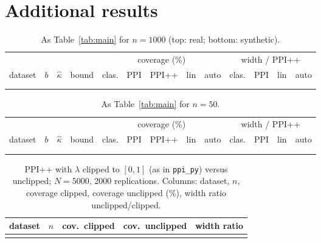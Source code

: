 \documentclass{article}
\begin{document}
\section{Additional results}
\begin{table}[h]
\caption{As Table~\ref{tab:main} for $n=1000$ (top: real; bottom: synthetic).}\label{tab:n1000}
\centering\scriptsize\setlength{\tabcolsep}{2.6pt}
\begin{tabular}{lrrr|ccccc|cccc}\toprule
 & & & & \multicolumn{5}{c|}{coverage (\%)} & \multicolumn{4}{c}{width / PPI++} \\
dataset & $b$ & $\hat\kappa$ & bound & clas. & PPI & PPI++ & lin & auto & clas. & PPI & lin & auto \\\midrule
\\\midrule
\\\bottomrule\end{tabular}
\end{table}
\begin{table}[h]
\caption{As Table~\ref{tab:main} for $n=50$.}\label{tab:n50}
\centering\scriptsize\setlength{\tabcolsep}{2.6pt}
\begin{tabular}{lrrr|ccccc|cccc}\toprule
 & & & & \multicolumn{5}{c|}{coverage (\%)} & \multicolumn{4}{c}{width / PPI++} \\
dataset & $b$ & $\hat\kappa$ & bound & clas. & PPI & PPI++ & lin & auto & clas. & PPI & lin & auto \\\midrule
\\\midrule
\\\bottomrule\end{tabular}
\end{table}
\begin{table}[h]
\caption{PPI++ with $\lambda$ clipped to $[0,1]$ (as in \texttt{ppi\_py}) versus unclipped; $N=5000$, 2000 replications. Columns: dataset, $n$, coverage clipped, coverage unclipped (\%), width ratio unclipped/clipped.}\label{tab:noclip}
\centering\small\begin{tabular}{lrrrr}\toprule dataset & $n$ & cov.\ clipped & cov.\ unclipped & width ratio \\\midrule
\\\bottomrule\end{tabular}
\end{table}
\end{document}
